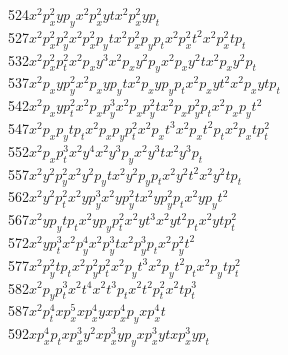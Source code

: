 \begin{tabbing}
524\>$x  ^2 p_x^2 y  p_y$\>$x  ^2 p_x^2 y  t  $\>$x  ^2 p_x^2 y  p_t$\\
527\>$x  ^2 p_x^2 p_y^2 $\>$x  ^2 p_x^2 p_yt  $\>$x  ^2 p_x^2 p_yp_t$\>$x  ^2 p_x^2 t  ^2 $\>$x  ^2 p_x^2 t  p_t$\\
532\>$x  ^2 p_x^2 p_t^2 $\>$x  ^2 p_xy  ^3    $\>$x  ^2 p_xy  ^2 p_y$\>$x  ^2 p_xy  ^2 t  $\>$x  ^2 p_xy  ^2 p_t$\\
537\>$x  ^2 p_xy  p_y^2 $\>$x  ^2 p_xy  p_yt  $\>$x  ^2 p_xy  p_yp_t$\>$x  ^2 p_xy  t  ^2 $\>$x  ^2 p_xy  t  p_t$\\
542\>$x  ^2 p_xy  p_t^2 $\>$x  ^2 p_xp_y^3    $\>$x  ^2 p_xp_y^2 t  $\>$x  ^2 p_xp_y^2 p_t$\>$x  ^2 p_xp_yt  ^2 $\\
547\>$x  ^2 p_xp_yt  p_t$\>$x  ^2 p_xp_yp_t^2 $\>$x  ^2 p_xt  ^3    $\>$x  ^2 p_xt  ^2 p_t$\>$x  ^2 p_xt  p_t^2 $\\
552\>$x  ^2 p_xp_t^3    $\>$x  ^2 y  ^4       $\>$x  ^2 y  ^3 p_y   $\>$x  ^2 y  ^3 t     $\>$x  ^2 y  ^3 p_t   $\\
557\>$x  ^2 y  ^2 p_y^2 $\>$x  ^2 y  ^2 p_yt  $\>$x  ^2 y  ^2 p_yp_t$\>$x  ^2 y  ^2 t  ^2 $\>$x  ^2 y  ^2 t  p_t$\\
562\>$x  ^2 y  ^2 p_t^2 $\>$x  ^2 y  p_y^3    $\>$x  ^2 y  p_y^2 t  $\>$x  ^2 y  p_y^2 p_t$\>$x  ^2 y  p_yt  ^2 $\\
567\>$x  ^2 y  p_yt  p_t$\>$x  ^2 y  p_yp_t^2 $\>$x  ^2 y  t  ^3    $\>$x  ^2 y  t  ^2 p_t$\>$x  ^2 y  t  p_t^2 $\\
572\>$x  ^2 y  p_t^3    $\>$x  ^2 p_y^4       $\>$x  ^2 p_y^3 t     $\>$x  ^2 p_y^3 p_t   $\>$x  ^2 p_y^2 t  ^2 $\\
577\>$x  ^2 p_y^2 t  p_t$\>$x  ^2 p_y^2 p_t^2 $\>$x  ^2 p_yt  ^3    $\>$x  ^2 p_yt  ^2 p_t$\>$x  ^2 p_yt  p_t^2 $\\
582\>$x  ^2 p_yp_t^3    $\>$x  ^2 t  ^4       $\>$x  ^2 t  ^3 p_t   $\>$x  ^2 t  ^2 p_t^2 $\>$x  ^2 t  p_t^3    $\\
587\>$x  ^2 p_t^4       $\>$x  p_x^5          $\>$x  p_x^4 y        $\>$x  p_x^4 p_y      $\>$x  p_x^4 t        $\\
592\>$x  p_x^4 p_t      $\>$x  p_x^3 y  ^2    $\>$x  p_x^3 y  p_y   $\>$x  p_x^3 y  t     $\>$x  p_x^3 y  p_t   $\\

\end{tabbing}
